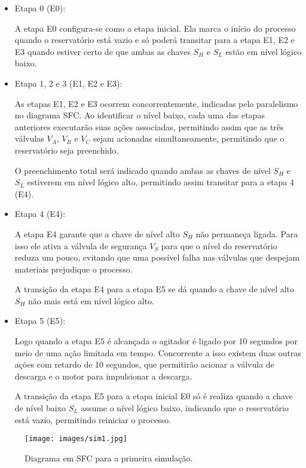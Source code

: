 \begin{itemize}
    \item Etapa 0 (E0):
    
    A etapa E0 configura-se como a etapa inicial. Ela marca o início do processo quando o reservatório está vazio e só poderá transitar para a etapa E1, E2 e E3 quando estiver certo de que ambas as chaves $S_H$ e $S_L$ estão em nível lógico baixo.
    
    \item Etapa 1, 2 e 3 (E1, E2 e E3):
    
    As etapas E1, E2 e E3 ocorrem concorrentemente, indicadas pelo paralelismo no diagrama SFC. Ao identificar o nível baixo, cada uma das etapas anteriores executarão suas ações associadas, permitindo assim que as três válvulas $V_A$, $V_B$ e $V_C$ sejam acionadas simultaneamente, permitindo que o reservatório seja preenchido.
    
    O preenchimento total será indicado quando ambas as chaves de nível $S_H$ e $S_L$ estiverem em nível lógico alto, permitindo assim transitar para a etapa 4 (E4).
    
    \item Etapa 4 (E4):
    
    A etapa E4 garante que a chave de nível alto $S_H$ não permaneça ligada. Para isso ele ativa a válvula de segurança $V_S$ para que o nível do reservatório reduza um pouco, evitando que uma possível falha nas válvulas que despejam materiais prejudique o processo.
    
    A transição da etapa E4 para a etapa E5 se dá quando a chave de nível alto $S_H$ não mais está em nível lógico alto.
    
    \item Etapa 5 (E5):
    
    Logo quando a etapa E5 é alcançada o agitador é ligado por 10 segundos por meio de uma ação limitada em tempo. Concorrente a isso existem duas outras ações com retardo de 10 segundos, que permitirão acionar a válvula de descarga e o motor para impulsionar a descarga. 
    
    A transição da etapa E5 para a etapa inicial E0 só é realiza quando a chave de nível baixo $S_L$ assume o nível lógico baixo, indicando que o reservatório está vazio, permitindo reiniciar o processo.
\end{itemize}


\begin{figure}[H] 
\centering
\texttt{[image: images/sim1.jpg]}
\caption{Diagrama em SFC para a primeira simulação.}
\label{sim1} 
\end{figure}